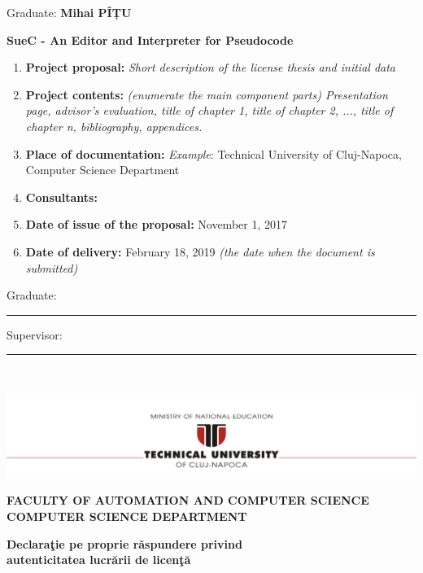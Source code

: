 \documentclass[12pt,a4paper,twoside]{report}
\renewcommand{\thesisauthor}{Mihai PÎȚU}    %
\renewcommand{\thesistitle}{SueC - An Editor and Interpreter for Pseudocode}
\newcommand{\department}{\bf FACULTY OF AUTOMATION AND COMPUTER SCIENCE\\
COMPUTER SCIENCE DEPARTMENT}
\newcommand{\utcnlogo}{\includegraphics[width=15cm]{img/tucn.jpg}}
\newcommand{\uline}[1]{\rule[0pt]{#1}{0.4pt}}
\begin{document}
\vspace{2cm}

\begin{center}
Graduate: {\bf \thesisauthor}

\vspace{1cm}

{\bf \thesistitle}
\end{center}

\vspace{1cm}

\begin{enumerate}
 \item {\bf Project proposal:} {\it Short description of the license thesis and initial data}
\item {\bf Project contents:} {\it (enumerate the main component parts) Presentation page, advisor's evaluation, title of chapter 1, title of chapter 2, ..., title of chapter n, bibliography, appendices.}
\item {\bf Place of documentation:} {\it Example}: Technical University of Cluj-Napoca, Computer Science Department
\item {\bf Consultants:}
\item {\bf Date of issue of the proposal:} November 1, 2017
\item {\bf Date of  delivery:} February 18, 2019 {\it (the date when the document is submitted)}
  \end{enumerate}
\vspace{1.2cm}

\hspace{6cm} Graduate: \uline{6cm} 

\vspace{0.5cm}
\hspace{6cm} Supervisor: \uline{6cm} 

\thispagestyle{empty}


\newpage
$ $


\thispagestyle{empty}
\newpage

\begin{center}
\utcnlogo

\department
\end{center}

\vspace{0.5cm}

\begin{center}
{\bf
Declara\c{t}ie pe proprie r\u{a}spundere privind\\ 
autenticitatea lucr\u{a}rii de licen\c{t}\u{a}}
\end{center}
\vspace{1cm}
\end{document}
